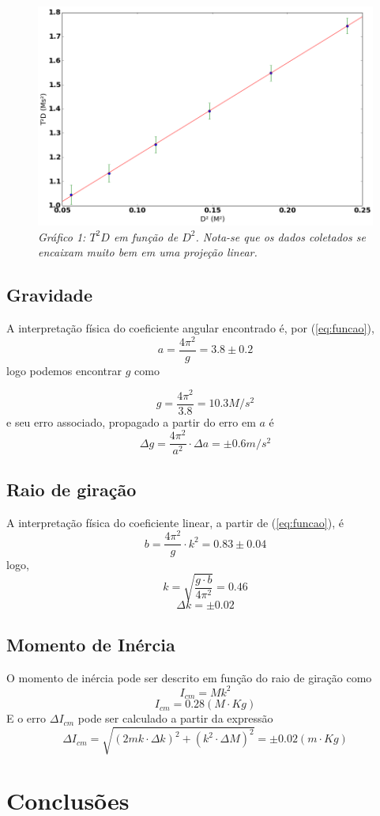 \documentclass[12pt,a4paper]{article}
\begin{document}
\begin{figure}[!hbtbp]

\includegraphics[scale=0.55]{index.png} 
\emph{Gráfico 1: $T^2D$ em função de $D^2$. Nota-se que os dados coletados se encaixam muito bem em uma projeção linear.}

\end{figure}
\subsection{Gravidade}
A interpretação física do coeficiente angular encontrado é, por (\ref{eq:funcao}),
 $$ a = \frac{4\pi^2}{g} = 3.8 \pm 0.2$$
  logo podemos encontrar $g$ como 

  $$ g = \frac{4\pi^2}{3.8} = 10.3 M/s^2 $$ 
  e seu erro associado, propagado a partir do erro em $a$ é
  $$ \Delta g = \frac{4\pi^2}{a^2} \cdot \Delta a = \pm 0.6 m/s^2 $$
  
\subsection{Raio de giração}

A interpretação física do coeficiente linear, a partir de (\ref{eq:funcao}), é 
$$ b = \frac{4\pi^2}{g} \cdot k^2 = 0.83 \pm 0.04 $$
logo, 
$$ k = \sqrt{\frac{g \cdot b}{4\pi^2}} = 0.46 $$
$$ \Delta k = \pm 0.02 $$

\subsection{Momento de Inércia}
O momento de inércia pode ser descrito em função do raio de giração como 
$$ I_{cm}  = Mk^2 $$
$$ I_{cm}  = 0.28 (M \cdot Kg)$$
E o erro $ \Delta I_{cm}$ pode ser calculado a partir da expressão 
$$\Delta I_{cm}  =\sqrt{(2mk \cdot \Delta k)^2 + (k^2 \cdot \Delta M)^2} = \pm 0.02 (m \cdot Kg) $$

\section{Conclusões}
\end{document}
